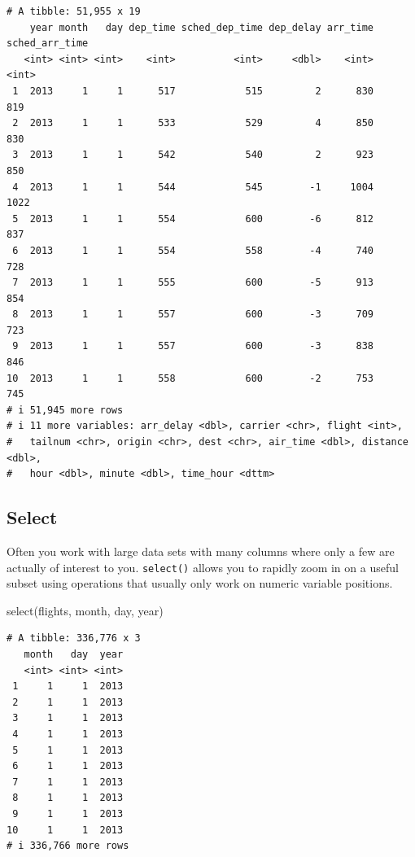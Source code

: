 \documentclass[
  letterpaper,
  DIV=11,
  numbers=noendperiod,
  oneside]{scrreprt}
\newenvironment{Shaded}{\begin{snugshade}}{\end{snugshade}}
\newcommand{\FunctionTok}[1]{\textcolor[rgb]{0.28,0.35,0.67}{#1}}
\newcommand{\NormalTok}[1]{\textcolor[rgb]{0.00,0.23,0.31}{#1}}
\begin{document}
\begin{verbatim}
# A tibble: 51,955 x 19
    year month   day dep_time sched_dep_time dep_delay arr_time sched_arr_time
   <int> <int> <int>    <int>          <int>     <dbl>    <int>          <int>
 1  2013     1     1      517            515         2      830            819
 2  2013     1     1      533            529         4      850            830
 3  2013     1     1      542            540         2      923            850
 4  2013     1     1      544            545        -1     1004           1022
 5  2013     1     1      554            600        -6      812            837
 6  2013     1     1      554            558        -4      740            728
 7  2013     1     1      555            600        -5      913            854
 8  2013     1     1      557            600        -3      709            723
 9  2013     1     1      557            600        -3      838            846
10  2013     1     1      558            600        -2      753            745
# i 51,945 more rows
# i 11 more variables: arr_delay <dbl>, carrier <chr>, flight <int>,
#   tailnum <chr>, origin <chr>, dest <chr>, air_time <dbl>, distance <dbl>,
#   hour <dbl>, minute <dbl>, time_hour <dttm>
\end{verbatim}

\subsection{Select}\label{select}

Often you work with large data sets with many columns where only a few
are actually of interest to you. \texttt{select()} allows you to rapidly
zoom in on a useful subset using operations that usually only work on
numeric variable positions.

\begin{Shaded}
\begin{Highlighting}[]
\FunctionTok{select}\NormalTok{(flights, month, day, year)}
\end{Highlighting}
\end{Shaded}

\begin{verbatim}
# A tibble: 336,776 x 3
   month   day  year
   <int> <int> <int>
 1     1     1  2013
 2     1     1  2013
 3     1     1  2013
 4     1     1  2013
 5     1     1  2013
 6     1     1  2013
 7     1     1  2013
 8     1     1  2013
 9     1     1  2013
10     1     1  2013
# i 336,766 more rows
\end{verbatim}
\end{document}
